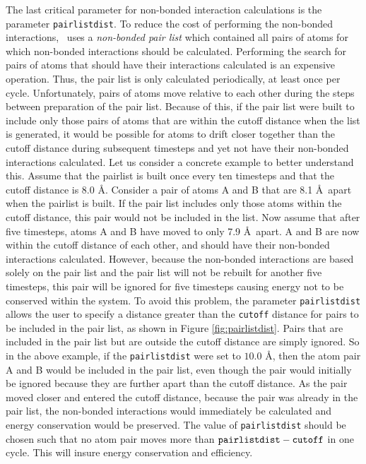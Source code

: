The last critical parameter for non-bonded
interaction calculations is the parameter {\tt pairlistdist}.  To reduce the
cost of performing the non-bonded interactions, \NAMD\ uses a {\it non-bonded
pair list} which contained all pairs of atoms for which
non-bonded interactions
should be calculated.  Performing the search for pairs of atoms that
should have their interactions calculated is an expensive operation.  Thus,
the pair list is only calculated periodically, at least once per cycle.
Unfortunately,
pairs of atoms move relative to each other during the steps between preparation
of the pair list.  Because of this, if the pair list were built to include
only
those pairs of atoms that are within the cutoff distance
when the list is generated, it would
be possible 
for atoms to drift closer together
than the cutoff distance during subsequent timesteps and yet not
have their non-bonded interactions calculated.  
\prettypar
Let us consider a concrete example to better understand this.  Assume that the
pairlist is built once every ten timesteps and that the cutoff
distance is 8.0 \AA.  Consider a pair
of atoms A and B that are 8.1 \AA\ apart when the pairlist is built.
If the pair list
includes only those atoms within the cutoff distance, this pair would not
be included in the list.  Now assume that after five timesteps, atoms
A and B have moved to only 7.9 \AA\ apart.  A and B are now within the
cutoff distance of each other, and should have their
non-bonded interactions calculated.
However, because the non-bonded interactions are based solely on the pair list
and the pair list will not be rebuilt for another five timesteps, this pair
will be ignored for five timesteps causing energy not to be conserved 
within the system.  
\prettypar
To avoid this problem, the parameter {\tt pairlistdist} allows the user
to specify a distance greater than the {\tt cutoff} distance for pairs
to be included in the pair list, as shown in Figure \ref{fig:pairlistdist}.
Pairs that are included in the pair list but are outside the cutoff distance
are simply ignored.  So in the above example, if the {\tt pairlistdist}
were set to $10.0$ \AA, then 
the atom pair A and B would be included in the pair list, even though
the pair would initially be ignored because they are further apart than
the cutoff distance.  As the pair moved closer and entered the cutoff
distance, because the pair was already in the pair list, the non-bonded
interactions would immediately be calculated and energy conservation
would be preserved.  The value of {\tt pairlistdist} should be chosen
such that no atom pair moves more than 
$\mbox{{\tt pairlistdist}}-\mbox{{\tt cutoff}}$ 
in one cycle.  This will insure energy conservation and efficiency.


